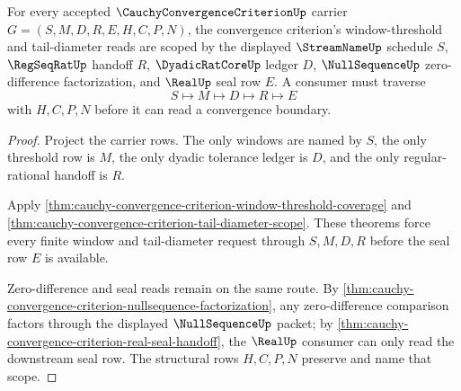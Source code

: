 \begin{theorem}
\label{thm:cauchy-convergence-criterion-scope-window}
For every accepted $\CauchyConvergenceCriterionUp$ carrier $G=(S,M,D,R,E,H,C,P,N)$, the convergence criterion's window-threshold and tail-diameter reads are scoped by the displayed $\StreamNameUp$ schedule $S$, $\RegSeqRatUp$ handoff $R$, $\DyadicRatCoreUp$ ledger $D$, $\NullSequenceUp$ zero-difference factorization, and $\RealUp$ seal row $E$. A consumer must traverse
$$
S\longmapsto M\longmapsto D\longmapsto R\longmapsto E
$$
with $H,C,P,N$ before it can read a convergence boundary.
\end{theorem}
\begin{proof}
Project the carrier rows. The only windows are named by $S$, the only threshold row is $M$, the only dyadic tolerance ledger is $D$, and the only regular-rational handoff is $R$.

Apply \autoref{thm:cauchy-convergence-criterion-window-threshold-coverage} and \autoref{thm:cauchy-convergence-criterion-tail-diameter-scope}. These theorems force every finite window and tail-diameter request through $S,M,D,R$ before the seal row $E$ is available.

Zero-difference and seal reads remain on the same route. By \autoref{thm:cauchy-convergence-criterion-nullsequence-factorization}, any zero-difference comparison factors through the displayed $\NullSequenceUp$ packet; by \autoref{thm:cauchy-convergence-criterion-real-seal-handoff}, the $\RealUp$ consumer can only read the downstream seal row. The structural rows $H,C,P,N$ preserve and name that scope.
\end{proof}

